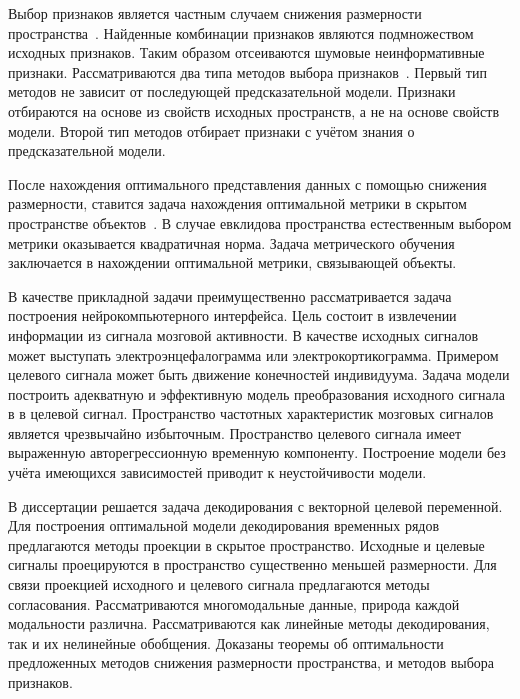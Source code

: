 Выбор признаков является частным случаем снижения размерности пространства~\cite{katrutsa2017comprehensive,katrutsa2015stress}. 
Найденные комбинации признаков являются подмножеством исходных признаков.
Таким образом отсеиваются шумовые неинформативные признаки.
Рассматриваются два типа методов выбора признаков~\cite{li2017feature,rodriguez2010quadratic,friedman2001elements}.
Первый тип методов не зависит от последующей предсказательной модели.
Признаки отбираются на основе из свойств исходных пространств, а не на основе свойств модели.
Второй тип методов отбирает признаки с учётом знания о предсказательной модели. 

После нахождения оптимального представления данных с помощью снижения размерности, ставится задача нахождения оптимальной метрики в скрытом пространстве объектов~\cite{wang2017deep,davis2007information,kulis2012metric,yang2006distance,weinberger2009distance}.
В случае евклидова пространства естественным выбором метрики оказывается квадратичная норма.
Задача метрического обучения заключается в нахождении оптимальной метрики, связывающей объекты.

В качестве прикладной задачи преимущественно рассматривается задача построения нейрокомпьютерного интерфейса. 
Цель состоит в извлечении информации из сигнала мозговой активности. 
В качестве исходных сигналов может выступать электроэнцефалограмма или электрокортикограмма. 
Примером целевого сигнала может быть движение конечностей индивидуума.
Задача модели построить адекватную и эффективную модель преобразования исходного сигнала в в целевой сигнал.
Пространство частотных характеристик мозговых сигналов является чрезвычайно избыточным. 
Пространство целевого сигнала имеет выраженную авторегрессионную временную компоненту.
Построение модели без учёта имеющихся зависимостей приводит к неустойчивости модели.

В диссертации решается задача декодирования с векторной целевой переменной. 
Для построения оптимальной модели декодирования временных рядов предлагаются методы проекции в скрытое пространство.
Исходные и целевые сигналы проецируются в пространство существенно меньшей размерности. 
Для связи проекцией исходного и целевого сигнала предлагаются методы согласования.
Рассматриваются многомодальные данные, природа каждой модальности различна.
Рассматриваются как линейные методы декодирования, так и их нелинейные обобщения.
Доказаны теоремы об оптимальности предложенных методов снижения размерности пространства, и методов выбора признаков.


